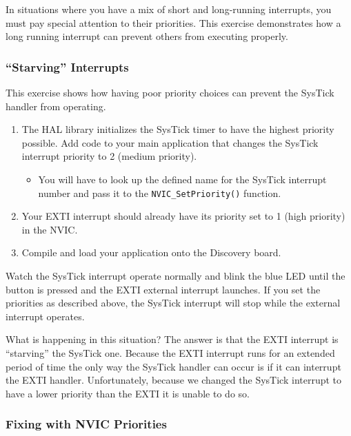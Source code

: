 \documentclass[11pt,fleqn]{book} %
\begin{document}
\begin{exercise}
   \label{ex7}  
   In situations where you have a mix of short and long-running interrupts, you must pay special attention to their priorities. This exercise demonstrates how a long running interrupt can prevent others from executing properly. 
   
    \subsubsection{``Starving'' Interrupts}
    This exercise shows how having poor priority choices can prevent the SysTick handler from operating.  
    
    \begin{enumerate}
        \item The HAL library initializes the SysTick timer to have the highest priority possible. Add code to your main application that changes the SysTick interrupt priority to 2 (medium priority). 
        \begin{itemize}
            \item You will have to look up the defined name for the SysTick interrupt number and pass it to the \texttt{NVIC\_SetPriority()} function.
        \end{itemize} 
        \item Your EXTI interrupt should already have its priority set to 1 (high priority) in the NVIC.
        \item Compile and load your application onto the Discovery board.
    \end{enumerate}
    
    \noindent Watch the SysTick interrupt operate normally and blink the blue LED until the button is pressed and the EXTI external interrupt launches. If you set the priorities as described above, the SysTick interrupt will stop while the external interrupt operates. 
    
    What is happening in this situation? The answer is that the EXTI interrupt is ``starving'' the SysTick one. Because the EXTI interrupt runs for an extended period of time the only way the SysTick handler can occur is if it can interrupt the EXTI handler. Unfortunately, because we changed the SysTick interrupt to have a lower priority than the EXTI it is unable to do so.

    \subsubsection{Fixing with NVIC Priorities}
    

\end{exercise}
\end{document}
